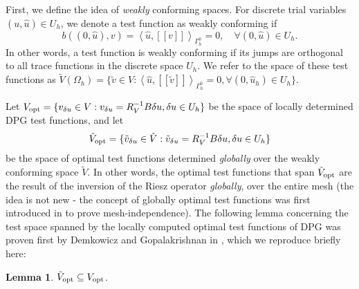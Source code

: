 \documentclass[11pt,onecolumn]{scrartcl}
\newcommand{\LRp}[1]{\left( #1 \right)}
\newcommand{\LRs}[1]{\left[ #1 \right]}
\newcommand{\LRa}[1]{\left\langle #1 \right\rangle}
\newcommand{\jump}[1] {\ensuremath{\LRs{\!\left[#1\right]\!}}}
\newcommand{\uh}{\widehat{u}}
\newcommand{\Gh}{\Gamma_h}
\newcommand{\Oh}{\Omega_h}
\newtheorem{lemma}{Lemma}
\begin{document}
First, we define the idea of \textit{weakly} conforming spaces.  For discrete trial variables $\LRp{u,\uh} \in U_h$, we denote a test function as weakly conforming if
\[
b\LRp{\LRp{0,\uh},v} = \LRa{\uh,\jump{v}}_{\Gh^0} = 0, \quad \forall \LRp{0,\uh} \in U_h.
\]
In other words, a test function is weakly conforming if its jumps are orthogonal to all trace functions in the discrete space $U_h$.  We refer to the space of these test functions as $\tilde{V}(\Oh) = \{\tilde{v}\in V: \LRa{\uh,\jump{\tilde{v}}}_{\Gh^0} = 0, \forall \LRp{0,\uh_h}\in U_h\}$.

Let $V_{\rm opt} = \{v_{\delta u} \in V: v_{\delta u}= R_V^{-1}B\delta u, \delta u \in U_h\}$ be the space of locally determined DPG test functions, and let 
\[
\tilde{V}_{\rm opt} = \{\tilde{v}_{\delta u} \in \tilde{V}: \tilde{v}_{\delta u} = R_{V}^{-1}B\delta u, \delta u \in U_h\}
\]
be the space of optimal test functions determined \textit{globally} over the weakly conforming space $\tilde{V}$.  In other words, the optimal test functions that span $\tilde{V}_{\rm opt}$ are the result of the inversion of the Riesz operator \textit{globally}, over the entire mesh (the idea is not new - the concept of globally optimal test functions was first introduced in \cite{DPG3pub} to prove mesh-independence). The following lemma concerning the test space spanned by the locally computed optimal test functions of DPG was proven first by Demkowicz and Gopalakrishnan in \cite{overviewDPG}, which we reproduce briefly here: 
\begin{lemma}
\label{lemma1}
$\tilde{V}_{\rm opt} \subseteq V_{\rm opt}$.
\end{lemma}
\end{document}
